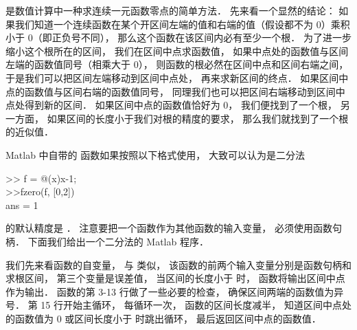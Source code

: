 
 是数值计算中一种求连续一元函数零点的简单方法． 先来看一个显然的结论： 如果我们知道一个连续函数在某个开区间左端的值和右端的值（假设都不为 0）乘积小于 0（即正负号不同）， 那么这个函数在该区间内必有至少一个根． 为了进一步缩小这个根所在的区间， 我们在区间中点求函数值， 如果中点处的函数值与区间左端的函数值同号（相乘大于 0）， 则函数的根必然在区间中点和区间右端之间， 于是我们可以把区间左端移动到区间中点处， 再来求新区间的终点． 如果区间中点的函数值与区间右端的函数值同号， 同理我们也可以把区间右端移动到区间中点处得到新的区间． 如果区间中点的函数值恰好为 0， 我们便找到了一个根， 另一方面， 如果区间的长度小于我们对根的精度的要求， 那么我们就找到了一个根的近似值．

Matlab 中自带的  函数如果按照以下格式使用， 大致可以认为是二分法
\begin{Command}
>> f = @(x)x-1; \\
>>fzero(f, [0,2])\\
ans = 1
\end{Command}
 的默认精度是 ． 注意要把一个函数作为其他函数的输入变量， 必须使用函数句柄． 下面我们给出一个二分法的 Matlab 程序．


我们先来看函数的自变量， 与  类似， 该函数的前两个输入变量分别是函数句柄和求根区间， 第三个变量是误差值， 当区间的长度小于  时， 函数将输出区间中点作为输出． 函数的第 3-13 行做了一些必要的检查， 确保区间两端的函数值为异号． 第 15 行开始主循环， 每循环一次， 函数的区间长度减半， 知道区间中点处的函数值为 0 或区间长度小于  时跳出循环， 最后返回区间中点的函数值．
